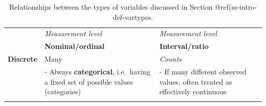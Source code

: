\documentclass[11pt,a4paper,openany]{book}
\begin{document}
\begin{longtable}[]{@{}lll@{}}
\caption{\label{tab:t-vartypes} Relationships between the types of variables
discussed in Section @ref(ss-intro-def-vartypes.}\tabularnewline
\toprule
\begin{minipage}[t]{0.22\columnwidth}\raggedright\strut
\strut
\end{minipage} & \begin{minipage}[t]{0.41\columnwidth}\raggedright\strut
\emph{Measurement level}\strut
\end{minipage} & \begin{minipage}[t]{0.27\columnwidth}\raggedright\strut
\emph{Measurement level}\strut
\end{minipage}\tabularnewline
\begin{minipage}[t]{0.22\columnwidth}\raggedright\strut
\strut
\end{minipage} & \begin{minipage}[t]{0.41\columnwidth}\raggedright\strut
\textbf{Nominal/ordinal}\strut
\end{minipage} & \begin{minipage}[t]{0.27\columnwidth}\raggedright\strut
\textbf{Interval/ratio}\strut
\end{minipage}\tabularnewline
\begin{minipage}[t]{0.22\columnwidth}\raggedright\strut
\textbf{Discrete}\strut
\end{minipage} & \begin{minipage}[t]{0.41\columnwidth}\raggedright\strut
Many\strut
\end{minipage} & \begin{minipage}[t]{0.27\columnwidth}\raggedright\strut
\emph{Counts}\strut
\end{minipage}\tabularnewline
\begin{minipage}[t]{0.22\columnwidth}\raggedright\strut
\strut
\end{minipage} & \begin{minipage}[t]{0.41\columnwidth}\raggedright\strut
- Always \textbf{categorical}, i.e.~having a fixed set of possible
values (categories)\strut
\end{minipage} & \begin{minipage}[t]{0.27\columnwidth}\raggedright\strut
- If many different observed values, often treated as effectively
continuous\strut
\end{minipage}\tabularnewline
\begin{minipage}[t]{0.22\columnwidth}\raggedright\strut
\strut
\end{minipage} & \begin{minipage}[t]{0.41\columnwidth}\raggedright\strut

\end{minipage}
\end{longtable}
\end{document}
